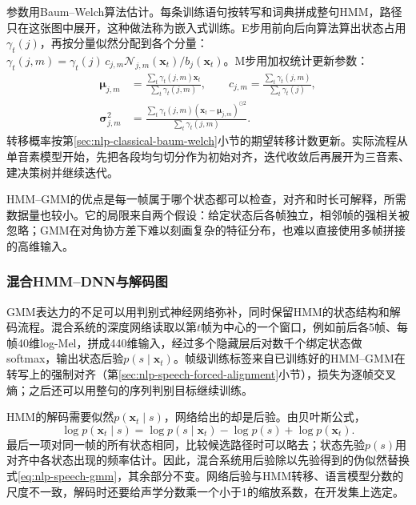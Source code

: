 参数用Baum--Welch算法估计。每条训练语句按转写和词典拼成整句HMM，路径只在这张图中展开，这种做法称为嵌入式训练。E步用前向后向算法算出状态占用$\gamma_t(j)$，再按分量似然分配到各个分量：$\gamma_t(j,m)=\gamma_t(j)\,c_{j,m}\mathcal{N}_{j,m}(\bm{x}_t)/b_j(\bm{x}_t)$。M步用加权统计更新参数：
\begin{equation}
\begin{aligned}
 \bm{\mu}_{j,m}&=\frac{\sum_t\gamma_t(j,m)\bm{x}_t}{\sum_t\gamma_t(j,m)},\qquad
 c_{j,m}=\frac{\sum_t\gamma_t(j,m)}{\sum_t\gamma_t(j)},\\
 \bm{\sigma}_{j,m}^2&=\frac{\sum_t\gamma_t(j,m)(\bm{x}_t-\bm{\mu}_{j,m})^{\odot2}}{\sum_t\gamma_t(j,m)}.
\end{aligned}
 \label{eq:nlp-speech-gmm-update}
\end{equation}
转移概率按第\ref{sec:nlp-classical-baum-welch}小节的期望转移计数更新。实际流程从单音素模型开始，先把各段均匀切分作为初始对齐，迭代收敛后再展开为三音素、建决策树并继续迭代。

HMM--GMM的优点是每一帧属于哪个状态都可以检查，对齐和时长可解释，所需数据量也较小。它的局限来自两个假设：给定状态后各帧独立，相邻帧的强相关被忽略；GMM在对角协方差下难以刻画复杂的特征分布，也难以直接使用多帧拼接的高维输入。

\subsubsection{混合HMM--DNN与解码图}
\label{sec:nlp-speech-hybrid}

GMM表达力的不足可以用判别式神经网络弥补，同时保留HMM的状态结构和解码流程。混合系统的深度网络读取以第$t$帧为中心的一个窗口，例如前后各5帧、每帧40维log-Mel，拼成440维输入，经过多个隐藏层后对数千个绑定状态做softmax，输出状态后验$p(s\mid\bm{x}_t)$。帧级训练标签来自已训练好的HMM--GMM在转写上的强制对齐（第\ref{sec:nlp-speech-forced-alignment}小节），损失为逐帧交叉熵；之后还可以用整句的序列判别目标继续训练。

HMM的解码需要似然$p(\bm{x}_t\mid s)$，网络给出的却是后验。由贝叶斯公式，
\begin{equation}
 \log p(\bm{x}_t\mid s)=\log p(s\mid\bm{x}_t)-\log p(s)+\log p(\bm{x}_t).
 \label{eq:nlp-speech-hybrid-likelihood}
\end{equation}
最后一项对同一帧的所有状态相同，比较候选路径时可以略去；状态先验$p(s)$用对齐中各状态出现的频率估计。因此，混合系统用后验除以先验得到的伪似然替换式\eqref{eq:nlp-speech-gmm}，其余部分不变。网络后验与HMM转移、语言模型分数的尺度不一致，解码时还要给声学分数乘一个小于1的缩放系数，在开发集上选定。

